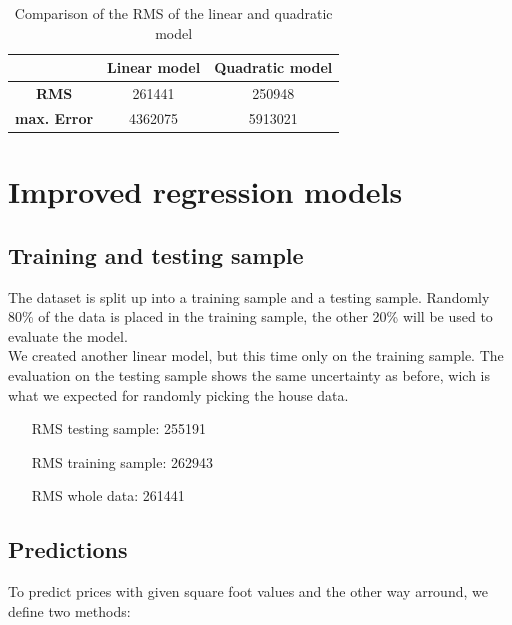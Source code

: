 \documentclass[12pt]{scrreprt}
\begin{document}
\begin{table}[H]
  \caption{Comparison of the RMS of the linear and quadratic model}
  \label{tab:rmse_models}
  \begin{center}
    \begin{tabular}{| c | c | c |}
      \hline
      & \textbf{Linear model} & \textbf{Quadratic model}\\
      \hline
      \hline
      \textbf{RMS} & 261441 & 250948 \\ \hline
      \textbf{max. Error} & 4362075 & 5913021 \\ \hline
    \end{tabular}	
  \end{center}
\end{table}

\chapter{Improved regression models} 
\label{chpt:irm}

\section{Training and testing sample}

The dataset is split up into a training sample and a testing sample. Randomly 80\% of the data is placed in the training sample, the other 20\% will be used to evaluate the model.\\

We created another linear model, but this time only on the training sample. The evaluation on the testing sample shows the same uncertainty as before, wich is what we expected for randomly picking the house data.\\

\begin{center}
	\begin{itemize}
		\item[RMS testing sample:] 255191
		\item[RMS training sample:] 262943
		\item[RMS whole data:] 261441
	\end{itemize}
\end{center}

\section{Predictions}

To predict prices with given square foot values and the other way arround, we define two methods:\\
\end{document}
